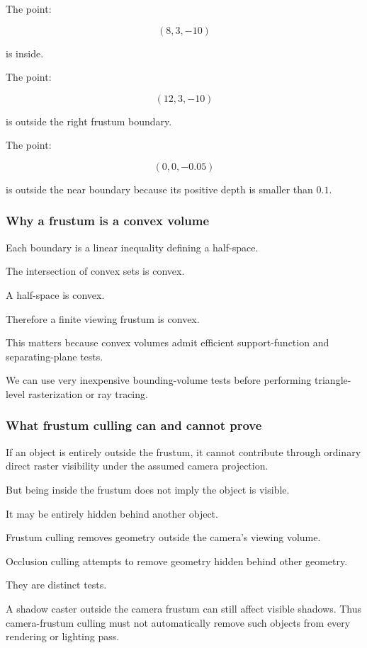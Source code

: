 The point:

\[
 (8,3,-10)
\]

is inside.

The point:

\[
 (12,3,-10)
\]

is outside the right frustum boundary.

The point:

\[
 (0,0,-0.05)
\]

is outside the near boundary because its positive depth is smaller than \(0.1\).

\subsubsection{Why a frustum is a convex volume}\label{why-a-frustum-is-a-convex-volume}

Each boundary is a linear inequality defining a half-space.

The intersection of convex sets is convex.

A half-space is convex.

Therefore a finite viewing frustum is convex.

This matters because convex volumes admit efficient support-function and separating-plane tests.

We can use very inexpensive bounding-volume tests before performing triangle-level rasterization or ray tracing.

\subsubsection{What frustum culling can and cannot prove}\label{what-frustum-culling-can-and-cannot-prove}

If an object is entirely outside the frustum, it cannot contribute through ordinary direct raster visibility under the assumed camera projection.

But being inside the frustum does not imply the object is visible.

It may be entirely hidden behind another object.

Frustum culling removes geometry outside the camera's viewing volume.

Occlusion culling attempts to remove geometry hidden behind other geometry.

They are distinct tests.

A shadow caster outside the camera frustum can still affect visible shadows. Thus camera-frustum culling must not automatically remove such objects from every rendering or lighting pass.

